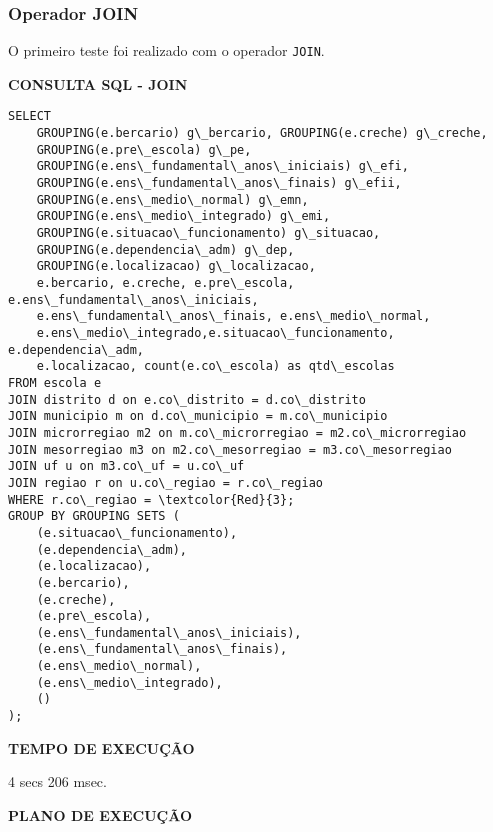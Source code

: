 \documentclass[12pt,a4paper]{article}
\begin{document}
\subsubsection{Operador JOIN}

O primeiro teste foi realizado com o operador \texttt{JOIN}.

\vspace{0.5cm}
\begin{flushleft}
\textbf{CONSULTA SQL - JOIN}\\
\end{flushleft}

\begin{Verbatim}[commandchars=\\\{\}]
SELECT
    GROUPING(e.bercario) g\_bercario, GROUPING(e.creche) g\_creche, 
    GROUPING(e.pre\_escola) g\_pe,
    GROUPING(e.ens\_fundamental\_anos\_iniciais) g\_efi,
    GROUPING(e.ens\_fundamental\_anos\_finais) g\_efii, 
    GROUPING(e.ens\_medio\_normal) g\_emn,
    GROUPING(e.ens\_medio\_integrado) g\_emi, 
    GROUPING(e.situacao\_funcionamento) g\_situacao,
    GROUPING(e.dependencia\_adm) g\_dep, 
    GROUPING(e.localizacao) g\_localizacao,
    e.bercario, e.creche, e.pre\_escola, e.ens\_fundamental\_anos\_iniciais,
    e.ens\_fundamental\_anos\_finais, e.ens\_medio\_normal,
    e.ens\_medio\_integrado,e.situacao\_funcionamento, e.dependencia\_adm, 
    e.localizacao, count(e.co\_escola) as qtd\_escolas
FROM escola e
JOIN distrito d on e.co\_distrito = d.co\_distrito
JOIN municipio m on d.co\_municipio = m.co\_municipio
JOIN microrregiao m2 on m.co\_microrregiao = m2.co\_microrregiao
JOIN mesorregiao m3 on m2.co\_mesorregiao = m3.co\_mesorregiao
JOIN uf u on m3.co\_uf = u.co\_uf
JOIN regiao r on u.co\_regiao = r.co\_regiao
WHERE r.co\_regiao = \textcolor{Red}{3};
GROUP BY GROUPING SETS (
    (e.situacao\_funcionamento),
    (e.dependencia\_adm),
    (e.localizacao),
    (e.bercario),
    (e.creche),
    (e.pre\_escola),
    (e.ens\_fundamental\_anos\_iniciais),
    (e.ens\_fundamental\_anos\_finais),
    (e.ens\_medio\_normal),
    (e.ens\_medio\_integrado),
    ()
);
\end{Verbatim}

\begin{flushleft}
\textbf{TEMPO DE EXECUÇÃO}\\
\end{flushleft}
4 secs 206 msec.\\

\begin{flushleft}
\textbf{PLANO DE EXECUÇÃO}\\
\end{flushleft}
\end{document}

